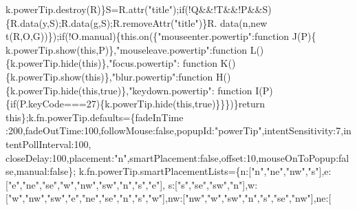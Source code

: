 \begin{DoxyCode}
{      k.powerTip.destroy(R)\}S=R.attr(\textcolor{stringliteral}{"title"});\textcolor{keywordflow}{if}(!Q&&!T&&!P&&S)\{R.data(y,S);R.data(g,S);R.removeAttr(\textcolor{stringliteral}{"title"})\}R.
      data(n,\textcolor{keyword}{new} t(R,O,G))\});\textcolor{keywordflow}{if}(!O.manual)\{this.on(\{\textcolor{stringliteral}{"mouseenter.powertip"}:\textcolor{keyword}{function} J(P)\{
      k.powerTip.show(\textcolor{keyword}{this},P)\},\textcolor{stringliteral}{"mouseleave.powertip"}:\textcolor{keyword}{function} L()\{k.powerTip.hide(\textcolor{keyword}{this})\},\textcolor{stringliteral}{"focus.powertip"}:\textcolor{keyword}{
      function} K()\{k.powerTip.show(\textcolor{keyword}{this})\},\textcolor{stringliteral}{"blur.powertip"}:\textcolor{keyword}{function} H()\{k.powerTip.hide(\textcolor{keyword}{this},\textcolor{keyword}{true})\},\textcolor{stringliteral}{"keydown.powertip"}:\textcolor{keyword}{
      function} I(P)\{\textcolor{keywordflow}{if}(P.keyCode===27)\{k.powerTip.hide(\textcolor{keyword}{this},\textcolor{keyword}{true})\}\}\})\}\textcolor{keywordflow}{return} \textcolor{keyword}{this}\};k.fn.powerTip.defaults=\{fadeInTime
      :200,fadeOutTime:100,followMouse:\textcolor{keyword}{false},popupId:\textcolor{stringliteral}{"powerTip"},intentSensitivity:7,intentPollInterval:100,
      closeDelay:100,placement:\textcolor{stringliteral}{"n"},smartPlacement:\textcolor{keyword}{false},offset:10,mouseOnToPopup:\textcolor{keyword}{false},manual:\textcolor{keyword}{false}\};
      k.fn.powerTip.smartPlacementLists=\{n:[\textcolor{stringliteral}{"n"},\textcolor{stringliteral}{"ne"},\textcolor{stringliteral}{"nw"},\textcolor{stringliteral}{"s"}],e:[\textcolor{stringliteral}{"e"},\textcolor{stringliteral}{"ne"},\textcolor{stringliteral}{"se"},\textcolor{stringliteral}{"w"},\textcolor{stringliteral}{"nw"},\textcolor{stringliteral}{"sw"},\textcolor{stringliteral}{"n"},\textcolor{stringliteral}{"s"},\textcolor{stringliteral}{"e"}],
      s:[\textcolor{stringliteral}{"s"},\textcolor{stringliteral}{"se"},\textcolor{stringliteral}{"sw"},\textcolor{stringliteral}{"n"}],w:[\textcolor{stringliteral}{"w"},\textcolor{stringliteral}{"nw"},\textcolor{stringliteral}{"sw"},\textcolor{stringliteral}{"e"},\textcolor{stringliteral}{"ne"},\textcolor{stringliteral}{"se"},\textcolor{stringliteral}{"n"},\textcolor{stringliteral}{"s"},\textcolor{stringliteral}{"w"}],nw:[\textcolor{stringliteral}{"nw"},\textcolor{stringliteral}{"w"},\textcolor{stringliteral}{"sw"},\textcolor{stringliteral}{"n"},\textcolor{stringliteral}{"s"},\textcolor{stringliteral}{"se"},\textcolor{stringliteral}{"nw"}],ne:[\textcolor{stringliteral}{
}}
\end{DoxyCode}
